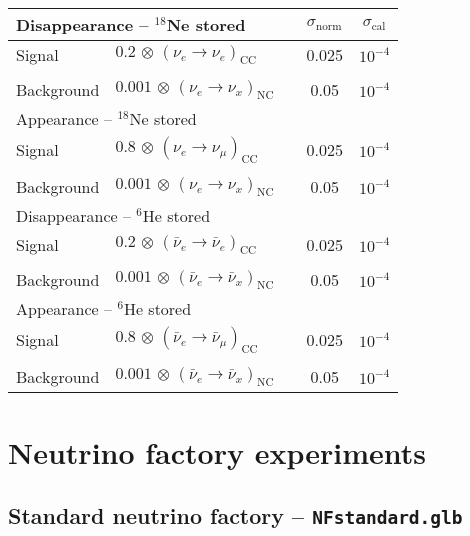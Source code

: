 \begin{center}
\begin{tabular}{|l|ll|c|c|}
\hline \hline
\multicolumn{3}{|l|}{Disappearance -- $^{18}$Ne stored} & $\sigma_\mathrm{norm}$ & $\sigma_\mathrm{cal}$ \\ \hline
Signal & $0.2 \, \otimes \, (\nu_e\rightarrow\nu_e)_{\mathrm{CC}}$ & \hspace{6cm} & 0.025 & $10^{-4}$ \\
 & & & & \\
Background & $0.001 \, \otimes \, (\nu_e \rightarrow \nu_x)_\mathrm{NC}$ & & 0.05 & $10^{-4}$ \\ \hline \hline 
\multicolumn{3}{|l|}{Appearance -- $^{18}$Ne stored} & & \\ \hline
Signal & $0.8 \, \otimes \, (\nu_e \rightarrow \nu_\mu)_\mathrm{CC}$ & & 0.025 & $10^{-4}$ \\
 & & & & \\
Background & $0.001 \, \otimes \, (\nu_e \rightarrow \nu_x)_\mathrm{NC}$ & & 0.05 & $10^{-4}$
\\ \hline \hline
\multicolumn{3}{|l|}{Disappearance -- $^6$He stored} & &  \\ \hline
Signal & $0.2 \, \otimes \, (\bar{\nu}_e\rightarrow\bar{\nu}_e)_{\mathrm{CC}}$ & & 0.025 & $10^{-4}$ \\
 & & & & \\
Background & $0.001 \, \otimes \, (\bar{\nu}_e \rightarrow \bar{\nu}_x)_\mathrm{NC}$ & & 0.05 & $10^{-4}$  \\ \hline \hline 
\multicolumn{3}{|l|}{Appearance -- $^6$He stored} & & \\ \hline
Signal & $0.8 \, \otimes \, (\bar{\nu}_e \rightarrow \bar{\nu}_\mu)_\mathrm{CC}$ & &
0.025 & $10^{-4}$ \\
 & & & & \\
Background & $0.001 \, \otimes \, (\bar{\nu}_e \rightarrow \bar{\nu}_x)_\mathrm{NC}$ & & 0.05 & $10^{-4}$ \\ \hline \hline
\end{tabular}
\end{center}

\section*{Neutrino factory experiments}
\subsection*{Standard neutrino factory -- {\tt NFstandard.glb}}


